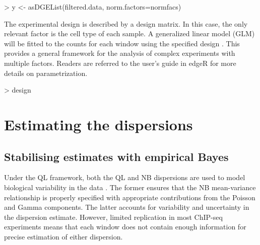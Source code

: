 \documentclass[12pt]{report}
\renewenvironment{Schunk}{\vspace{0pt}}{\vspace{0pt}}
\newcommand{\edger}{edgeR}
\begin{document}
\begin{Schunk}
\begin{Sinput}
> y <- asDGEList(filtered.data, norm.factors=normfacs)
\end{Sinput}
\end{Schunk}

The experimental design is described by a design matrix. 
In this case, the only relevant factor is the cell type of each sample. 
A generalized linear model (GLM) will be fitted to the counts for each window using the specified design \citep{mccarthy2012}. 
This provides a general framework for the analysis of complex experiments with multiple factors. 
Readers are referred to the user's guide in \edger{} for more details on parametrization.

\begin{Schunk}
\begin{Sinput}
> design
\end{Sinput}
\end{Schunk}

\section{Estimating the dispersions}

\subsection{Stabilising estimates with empirical Bayes}
\label{sec:dispest}
Under the QL framework, both the QL and NB dispersions are used to model biological variability in the data \citep{lund2012}. 
The former ensures that the NB mean-variance relationship is properly specified with appropriate contributions from the Poisson and Gamma components. 
The latter accounts for variability and uncertainty in the dispersion estimate. 
However, limited replication in most ChIP-seq experiments means that each window does not contain enough information for precise estimation of either dispersion. 

\end{document}
